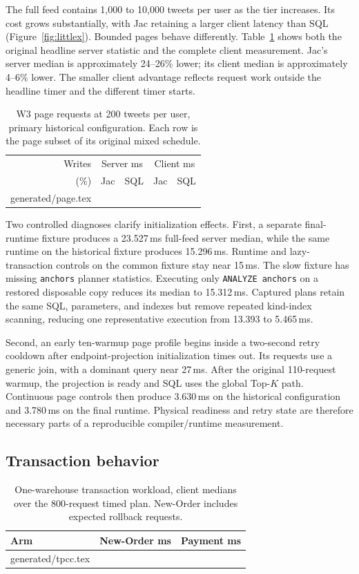 \documentclass[sigconf,nonacm]{acmart}
\makeatletter
\newcommand{\code}[1]{\texttt{#1}}
\newcommand{\tableinput}[1]{\@@input #1 }
\makeatother
\begin{document}
The full feed contains 1,000 to 10,000 tweets per user as the tier increases.
Its cost grows substantially, with Jac retaining a larger client latency than
SQL (Figure~\ref{fig:littlex}). Bounded pages behave differently.
Table~\ref{tab:page} shows both the original headline server statistic and
the complete client measurement. Jac's server median is approximately
24--26\% lower; its client median is approximately 4--6\% lower. The
smaller client advantage reflects request work outside the headline timer and
the different timer starts.

\begin{table}[t]
\caption{W3 page requests at 200 tweets per user, primary historical
configuration. Each row is the page subset of its original mixed schedule.}
\label{tab:page}
\centering\small
\setlength{\tabcolsep}{4pt}
\begin{tabular}{rrrrr}
\toprule
Writes & \multicolumn{2}{c}{Server ms} & \multicolumn{2}{c}{Client ms} \\
(\%) & Jac & SQL & Jac & SQL \\
\midrule
\tableinput{generated/page.tex}
\bottomrule
\end{tabular}
\end{table}

Two controlled diagnoses clarify initialization effects. First, a separate
final-runtime fixture produces a 23.527\,ms full-feed server median, while
the same runtime on the historical fixture produces 15.296\,ms. Runtime and
lazy-transaction controls on the common fixture stay near 15\,ms. The slow
fixture has missing \code{anchors} planner statistics. Executing only
\code{ANALYZE anchors} on a restored disposable copy reduces its median to
15.312\,ms. Captured plans retain the same SQL, parameters, and indexes but
remove repeated kind-index scanning, reducing one representative execution
from 13.393 to 5.465\,ms.

Second, an early ten-warmup page profile begins inside a two-second retry
cooldown after endpoint-projection initialization times out. Its requests use
a generic join, with a dominant query near 27\,ms. After the original
110-request warmup, the projection is ready and SQL uses the global Top-$K$
path. Continuous page controls then produce 3.630\,ms on the historical
configuration and 3.780\,ms on the final runtime. Physical readiness and
retry state are therefore necessary parts of a reproducible compiler/runtime
measurement.

\subsection{Transaction behavior}
\begin{table}[t]
\caption{One-warehouse transaction workload, client medians over the
800-request timed plan. New-Order includes expected rollback requests.}
\label{tab:tpcc}
\centering\small
\begin{tabular}{lrr}
\toprule
Arm & New-Order ms & Payment ms \\
\midrule
\tableinput{generated/tpcc.tex}
\bottomrule
\end{tabular}
\end{table}
\end{document}
